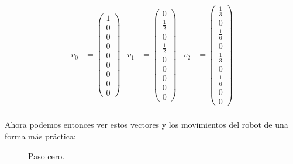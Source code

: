 \documentclass[../main.tex]{subfiles}
\begin{document}
\begin{align*}
  v_{0} &= \begin{pmatrix}
    1 \\
    0 \\
    0 \\
    0 \\
    0 \\
    0 \\
    0 \\
    0 \\
    0
  \end{pmatrix} &
  v_{1} &= \begin{pmatrix}
    0 \\
    \frac{1}{2} \\
    0 \\
    \frac{1}{2} \\
    0 \\
    0 \\
    0 \\
    0 \\
    0
  \end{pmatrix} &
  v_{2} &= \begin{pmatrix}
    \frac{1}{3} \\
    0 \\
    \frac{1}{6} \\
    0 \\
    \frac{1}{3} \\
    0 \\
    \frac{1}{6} \\
    0 \\
    0
  \end{pmatrix}
\end{align*}

\paragraph{} Ahora podemos entonces ver estos vectores y los movimientos del robot de una forma más práctica:

\begin{figure}[H]
  \centering
  \caption{Paso cero.}
\end{figure}
\end{document}

